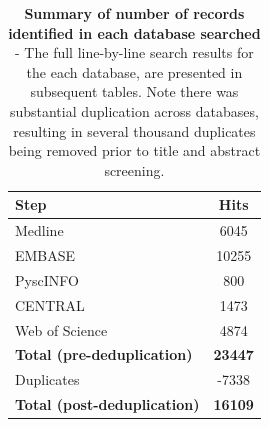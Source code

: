 \documentclass[a4paper, twoside]{templates/ociamthesis}
\begin{document}
\begin{table}[H]

\caption[Summary of number of records identified in each database searched]{\label{tab:searchOverviewAppendix-table}\textbf{Summary of number of records identified in each database searched} - The full line-by-line search results for the each database, are presented in subsequent tables. Note there was substantial duplication across databases, resulting in several thousand duplicates being removed prior to title and abstract screening.}
\centering
\begin{tabular}[t]{>{\raggedright\arraybackslash}p{15em}c}
\toprule
\textbf{Step} & \textbf{Hits}\\
\midrule
Medline & 6045\\
EMBASE & 10255\\
PyscINFO & 800\\
CENTRAL & 1473\\
Web of Science & 4874\\
\midrule
\textbf{Total (pre-deduplication)} & \textbf{23447}\\
Duplicates & -7338\\
\midrule
\textbf{Total (post-deduplication)} & \textbf{16109}\\
\bottomrule
\end{tabular}
\end{table}

~





\begingroup\fontsize{9}{11}\selectfont
\end{document}
